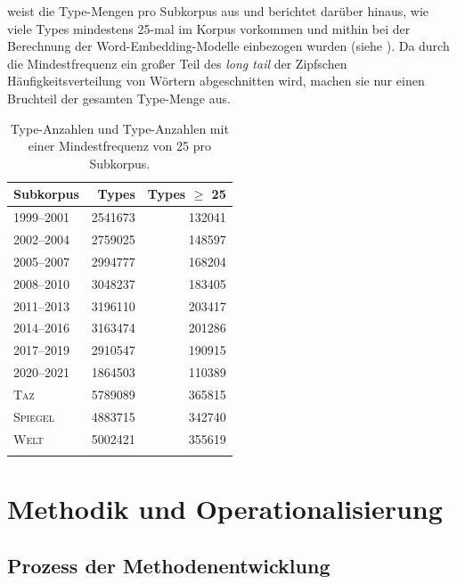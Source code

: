  weist die Type-Mengen pro Subkorpus aus und berichtet darüber hinaus, wie viele Types mindestens 25-mal im Korpus vorkommen und mithin bei der Berechnung der Word-Embedding-Modelle einbezogen wurden (siehe ). Da durch die Mindestfrequenz ein großer Teil des \emph{long tail} der Zipfschen Häufigkeitsverteilung von Wörtern abgeschnitten wird, machen sie nur einen Bruchteil der gesamten Type-Menge aus.

\begin{table}
  \caption{Type-Anzahlen und Type-Anzahlen mit einer Mindestfrequenz von 25 pro Subkorpus.}
  \label{tab:type_frequencies}
   \begin{tabular}{lrr}
    \lsptoprule
    Subkorpus     & Types      & Types $\geq$ 25\\ %
    \midrule
    1999--2001  & 2541673  & 132041 \\
    2002--2004  & 2759025  & 148597 \\
    2005--2007  & 2994777  & 168204 \\
    2008--2010  & 3048237  & 183405 \\
    2011--2013  & 3196110  & 203417 \\
    2014--2016  & 3163474  & 201286 \\
    2017--2019  & 2910547  & 190915 \\
    2020--2021  & 1864503  & 110389 \\
    \textsc{Taz}  & 5789089  & 365815 \\
    \textsc{Spiegel} & 4883715  & 342740 \\
    \textsc{Welt} & 5002421  & 355619 \\
    \lspbottomrule
   \end{tabular}
  \end{table}

\section{Methodik und Operationalisierung}\label{methodik-und-operationalisierung}

\subsection{Prozess der Methodenentwicklung}\label{prozess-der-methodenentwicklung}

